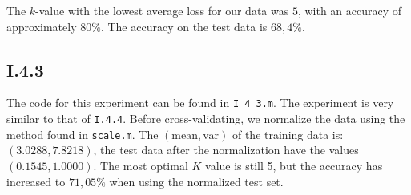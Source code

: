 The $k$-value with the lowest average loss for our data was $5$, with an accuracy of
approximately $80\%$. The accuracy on the test data is $68,4\%$.

\subsection{I.4.3}
The code for this experiment can be found in \texttt{I\_4\_3.m}. The experiment
is very similar to that of \texttt{I.4.4}. Before cross-validating, we normalize
the data using the method found in \texttt{scale.m}. The $(\text{mean},\text{var})$ of
the training data is: $(3.0288,7.8218)$, the test data after the normalization
have the values $(0.1545,1.0000)$. The most optimal $K$ value is still 5, but
the accuracy has increased to $71,05\%$ when using the normalized test set.
